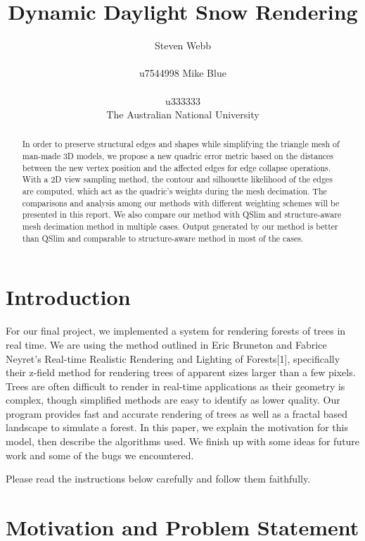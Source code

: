 \documentclass{article}
\title{Dynamic Daylight Snow Rendering}
\author{%
  Steven Webb\\\\
  u7544998 
   \And
  Mike Blue\\\\
  u333333\\
  \AND  The Australian National University 
}
\begin{document}
\maketitle


\begin{abstract}
  In order to preserve structural edges and shapes while simplifying the triangle mesh of man-made 3D models, we propose a new quadric error metric based on the distances between the new vertex position and the affected edges for edge collapse operations. With a 2D view sampling method, the contour and silhouette likelihood of the edges are computed, which act as the quadric’s weights during the mesh decimation. The comparisons and analysis among our methods with different weighting schemes will be presented in this report. We also compare our method with QSlim  and structure-aware mesh decimation method in multiple cases. Output generated by our method is better than QSlim and comparable to structure-aware method in most of the cases. 
\end{abstract}


\section{Introduction}

For our final project, we implemented a system for rendering forests of trees in real time. We are using the method outlined in Eric Bruneton and Fabrice Neyret’s Real-time Realistic Rendering and Lighting of Forests[1], specifically their z-field method for rendering trees of apparent sizes larger than a few pixels. Trees are often difficult to render in real-time applications as their geometry is complex, though simplified methods are easy to identify as lower quality. Our program provides fast and accurate rendering of trees as well as a fractal based landscape to simulate a forest. In this paper, we explain the motivation for this model, then describe the algorithms used. We finish up with some ideas for future work and some of the bugs we encountered.

Please read the instructions below carefully and follow them faithfully. 


\section{Motivation and Problem Statement}
\end{document}
